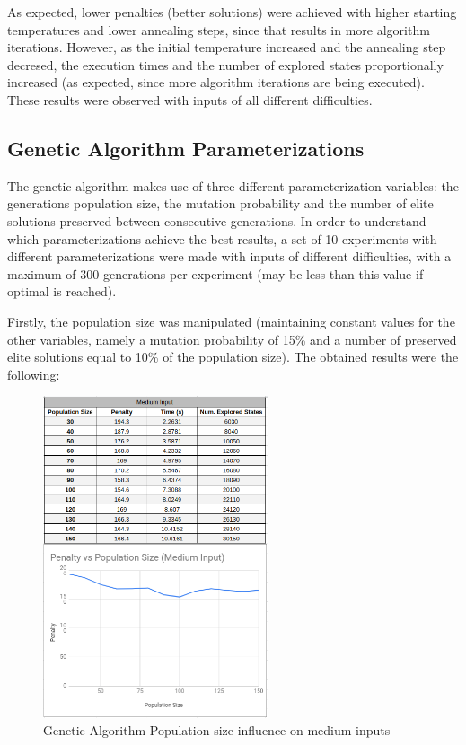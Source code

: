 \documentclass[conference]{IEEEtran}
\begin{document}
As expected, lower penalties (better solutions) were achieved with higher starting temperatures and lower annealing steps, since that results in more algorithm iterations. However, as the initial temperature increased and the annealing step decresed, the execution times and the number of explored states proportionally increased (as expected, since more algorithm iterations are being executed). These results were observed with inputs of all different difficulties.

\subsection{Genetic Algorithm Parameterizations}

The genetic algorithm makes use of three different parameterization variables: the generations population size, the mutation probability and the number of elite solutions preserved between consecutive generations. In order to understand which parameterizations achieve the best results, a set of 10 experiments with different parameterizations were made with inputs of different difficulties, with a maximum of 300 generations per experiment (may be less than this value if optimal is reached).

Firstly, the population size was manipulated (maintaining constant values for the other variables, namely a mutation probability of 15\% and a number of preserved elite solutions equal to 10\% of the population size). The obtained results were the following: 

\begin{figure}[H]
    \centerline{\includegraphics[width=250px]{genetic_pop_size_medium.png}}
    \caption{Genetic Algorithm Population size influence on medium inputs}
\end{figure}
\end{document}
